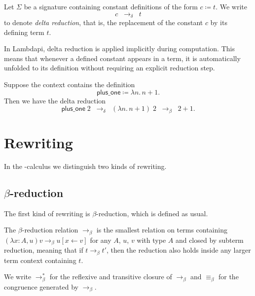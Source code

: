 \begin{definition}
Let $\Sigma$ be a signature containing constant definitions of the form 
$c \coloneqq t$. 
We write
\[
c \;\;\rightarrow_\delta\;\; t
\]
to denote \emph{delta reduction}, that is, the replacement of the constant 
$c$ by its defining term $t$.
\end{definition}

In Lambdapi, delta reduction is applied implicitly during computation.
This means that whenever a defined constant appears in a term, it is automatically unfolded to its definition without requiring an explicit reduction step.


\begin{example}
Suppose the context contains the definition
\[
\mathsf{plus\_one} \coloneqq \lambda n.\, n + 1.
\]
Then we have the delta reduction
\[
\mathsf{plus\_one}\;2 \;\;\rightarrow_\delta\;\; (\lambda n.\, n + 1)\;2
\;\;\rightarrow_\beta\;\; 2 + 1.
\]
\end{example}



\section{Rewriting}
\label{sect:lambdapi-rw}

In the \lpm-calculus we distinguish two kinds of rewriting.

\subsection{\texorpdfstring{$\beta$}{}-reduction}

The first kind of rewriting is $\beta$-reduction, which is defined as usual.

\begin{definition} The $\beta$-reduction relation $\longrightarrow_\beta$ is the smallest relation on terms containing
\( (\lambda x:A, u)v \longrightarrow_\beta u[x \leftarrow v] \) for any $A$, $u$, $v$ with type $A$ and closed by subterm reduction,
meaning that if $t \longrightarrow_\beta t'$, then the reduction also holds inside any larger term context containing $t$.
\end{definition}

\begin{notation}
We write $\longrightarrow^*_\beta$ for the reflexive and transitive closure of $\longrightarrow_\beta$ and $\equiv_\beta$ for the congruence generated by $\longrightarrow_\beta$.
\end{notation}

